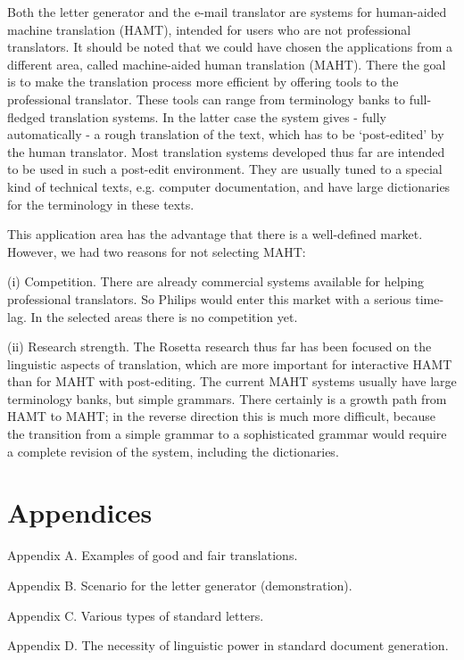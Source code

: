 Both the letter generator and the e-mail translator are systems for human-aided
machine translation (HAMT), intended for users who are not 
professional translators. 
It should be noted that we
could have chosen the applications from a different 
area, called machine-aided human translation (MAHT). 
There the goal is to make 
the translation process more efficient by offering tools to 
the professional translator. These tools can range from terminology banks to 
full-fledged translation systems. In the latter case the 
system gives - fully automatically - 
a rough translation of the text, which has to be `post-edited'
 by the 
human translator. Most translation systems developed thus far are 
intended to be used in
such a post-edit environment. They are usually tuned to a special kind of 
technical texts,
e.g. computer documentation, and have large dictionaries for the terminology in 
these texts. 

This application area has the advantage that there is a well-defined market.
However, we had two reasons for not selecting MAHT:

(i) Competition. There are already  commercial 
systems available for helping professional translators.
So Philips would enter this market with
a serious time-lag.
In the selected areas there is no competition yet. 

(ii) Research strength. The Rosetta 
research thus far has been focused on the linguistic aspects of translation,
which are more important for interactive HAMT than for MAHT with post-editing.  
The current MAHT systems usually have large terminology banks, but simple 
grammars.  There certainly is a 
growth path from HAMT to MAHT; in the reverse direction this is much more 
difficult, because the transition from a simple grammar to a sophisticated 
grammar would
require a complete revision of the system, including the dictionaries.


\section{Appendices}

Appendix A. Examples of good and fair translations.

Appendix B. Scenario for the letter generator (demonstration).

Appendix C. Various types of standard letters.

Appendix D. The necessity of linguistic power in standard document generation.





